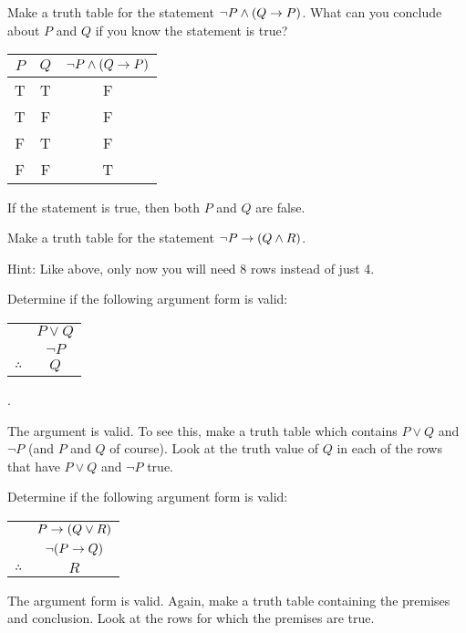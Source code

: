 \begin{questions}
\question Make a truth table for the statement $\neg P \wedge (Q \rightarrow P)$.  What can you conclude about $P$ and $Q$ if you know the statement is true?

    \begin{answer}
      \begin{tabular}{c|c|c}
             $P$ & $Q$ & $\neg P \wedge (Q \rightarrow P)$\\ \hline
             T & T & F \\
             T & F & F \\
             F & T & F \\
             F & F & T
          \end{tabular}
	If the statement is true, then both $P$ and $Q$ are false.
    \end{answer}


\question Make a truth table for the statement $\neg P \rightarrow (Q \wedge R)$.

  \begin{answer}
    Hint: Like above, only now you will need 8 rows instead of just 4.
  \end{answer}



\question Determine if the following argument form is valid: \begin{tabular}{rc} & $P \vee Q$ \\ & $\neg P$ \\ \hline $\therefore$ & $Q$\end{tabular}.

  \begin{answer}
    The argument is valid.  To see this, make a truth table which contains $P \vee Q$ and $\neg P$ (and $P$ and $Q$ of course).  Look at the truth value of $Q$ in each of the rows that have $P \vee Q$ and $\neg P$ true.  
  \end{answer}

  
  
  
\question Determine if the following argument form is valid: \begin{tabular}{rc} & $P \rightarrow (Q \vee R)$ \\ & $\neg(P \rightarrow Q)$ \\ \hline $\therefore$ & $R$\end{tabular}

  \begin{answer}
    The argument form is valid.  Again, make a truth table containing the premises and conclusion.  Look at the rows for which the premises are true.
  \end{answer}



\end{questions}

